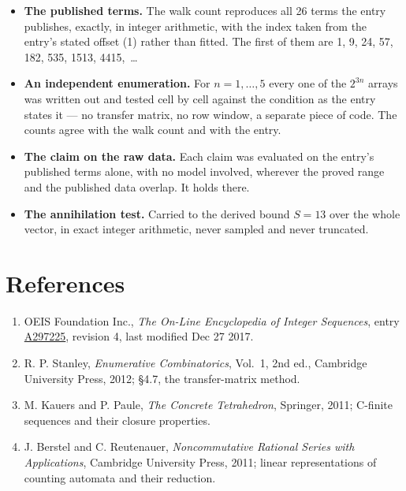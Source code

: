 \documentclass[11pt]{article}
\theoremstyle{definition}
\begin{document}
\begin{itemize}

\item {\bfseries The published terms.} The walk count reproduces all 26 terms the entry publishes, exactly, in integer arithmetic, with the index taken from the entry's stated offset (1) rather than fitted. The first of them are 1, 9, 24, 57, 182, 535, 1513, 4415,~\dots

\item {\bfseries An independent enumeration.} For $n = 1,\dots,5$ every one of the $2^{3n}$ arrays was written out and tested cell by cell against the condition as the entry states it --- no transfer matrix, no row window, a separate piece of code. The counts agree with the walk count and with the entry.

\item {\bfseries The claim on the raw data.} Each claim was evaluated on the entry's published terms alone, with no model involved, wherever the proved range and the published data overlap. It holds there.

\item {\bfseries The annihilation test.} Carried to the derived bound $S = 13$ over the whole vector, in exact integer arithmetic, never sampled and never truncated.

\end{itemize}

\section{References}

\begin{enumerate}

\item OEIS Foundation Inc., \emph{The On-Line Encyclopedia of Integer Sequences}, entry \href{https://oeis.org/A297225}{A297225}, revision 4, last modified Dec 27 2017.

\item R. P. Stanley, \emph{Enumerative Combinatorics}, Vol.~1, 2nd ed., Cambridge University Press, 2012; \S4.7, the transfer-matrix method.

\item M. Kauers and P. Paule, \emph{The Concrete Tetrahedron}, Springer, 2011; C-finite sequences and their closure properties.

\item J. Berstel and C. Reutenauer, \emph{Noncommutative Rational Series with Applications}, Cambridge University Press, 2011; linear representations of counting automata and their reduction.

\end{enumerate}
\end{document}
